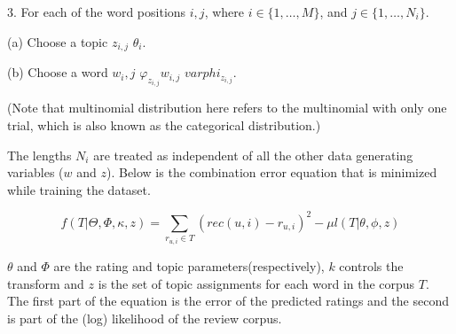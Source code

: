 3. For each of the word positions $i,j$, where $i\in \{1,\dots ,M\}$, and $j\in \{1,\dots ,N_{i}\}$.

\quad (a) Choose a topic $z_{i,j}$ $\theta_{i}$.

\quad (b) Choose a word $w_i,j$ $\varphi_{z_{i,j}} w_{i,j}$ $varphi _{z_{i,j}}$.

\quad (Note that multinomial distribution here refers to the multinomial with only one trial, which is also known as the categorical distribution.)

The lengths $N_{i}$ are treated as independent of all the other data generating variables ($w$ and $z$). Below is the combination error equation that is minimized while training the dataset.

\[
f ( T | \Theta , \Phi , \kappa , z ) = \sum_{r_{u,i} \in T} (rec(u,i) - {r_{u,i}})^2 - \mu l(T|\theta, \phi,z)
\tag{10}
\]

$\theta$ and $\Phi$ are the rating and topic parameters(respectively), $k$ controls the transform and $z$ is the set of topic assignments for each word in the corpus $T$. The first part of the equation is the error of the predicted ratings and the second is part of the (log) likelihood of the review corpus.